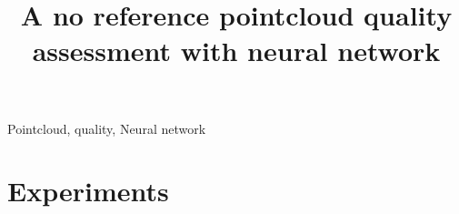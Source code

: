 \documentclass[lettersize,journal]{IEEEtran}
\begin{document}
\title{A no reference pointcloud quality assessment with neural network}

\author{}



\maketitle

\begin{abstract}

\end{abstract}

\begin{IEEEkeywords}
Pointcloud, quality, Neural network
\end{IEEEkeywords}









\section{Experiments}










\end{document}
